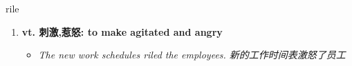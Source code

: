 
\begin{frame}
{\huge rile}
\begin{center}
\begin{enumerate}\Large
  \item \textbf{vt. 刺激,惹怒: to make agitated and angry}
  \begin{itemize}
    \item \em{\Large{The new work schedules riled the employees. 新的工作时间表激怒了员工}}
  \end{itemize}
\end{enumerate}
\end{center}
\end{frame}
